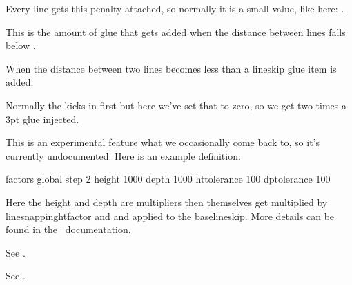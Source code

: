 Every line gets this penalty attached, so normally it is a small value, like
here: \the \linepenalty.

\stopoldprimitive

\startoldprimitive[title={\prm {lineskip}}]

This is the amount of glue that gets added when the distance between lines falls
below .

\stopoldprimitive

\startoldprimitive[title={\prm {lineskiplimit}}]

When the distance between two lines becomes less than  a \prm
{lineskip} glue item is added.

\startbuffer
{}
\stopbuffer

\typebuffer

Normally the  kicks in first but here we've set that to zero,
so we get two times a 3pt glue injected.

\startlocallinecorrection
\getbuffer
\stoplocallinecorrection

\stopoldprimitive

\startnewprimitive[title={\prm {linesnapping}}]

This is an experimental feature what we occasionally come back to, so it's
currently undocumented. Here is an example definition:

\starttyping
{}

\specificationdef \LineSnappingA {} factors global
    step           2
    height      1000
    depth       1000
    httolerance  100
    dptolerance  100
\relax
\stoptyping

Here the height and depth are multipliers then themselves get multiplied by \prm
{linesnappinghtfactor} and  and applied to the \prm
{baselineskip}. More details can be found in the \CONTEXT\ documentation.

\stopnewprimitive

\startnewprimitive[title={\prm {linesnappingdpfactor}}]

See .

\stopnewprimitive

\startnewprimitive[title={\prm {linesnappinghtfactor}}]

See .

